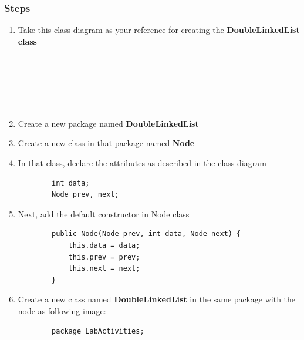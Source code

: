 \documentclass[12pt,titlepage]{article}
\begin{document}
\subsubsection{Steps}
\begin{enumerate}
    \item Take this class diagram as your reference for creating the \textbf{DoubleLinkedList class}
    \mbox{}\\
    \mbox{}\\
    \mbox{}\\
    \mbox{}\\
    \mbox{}\\
    \item Create a new package named \textbf{DoubleLinkedList}
    \item Create a new class in that package named \textbf{Node}
    \item In that class, declare the attributes as described in the class diagram
    \begin{verbatim}
        int data;
        Node prev, next;
    \end{verbatim}
    \item Next, add the default constructor in Node class
    \begin{verbatim}
        public Node(Node prev, int data, Node next) {
            this.data = data;
            this.prev = prev;
            this.next = next;
        }
    \end{verbatim}
    \item Create a new class named \textbf{DoubleLinkedList} in the same package with the node as following image:
    \begin{verbatim}
        package LabActivities;


\end{verbatim}
\end{enumerate}
\end{document}
